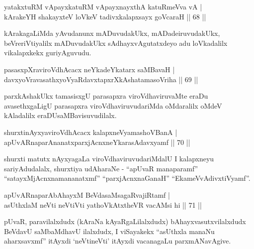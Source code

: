 \begin{shl}
yatakxtuRM vA\s payxkatuRM vA\s payxnayxthA katuRmeVva vA  | \\
kArakeYH shakayxteV loVkeV tadivxkalapxsayx goVcaraH  \hfill||  68 ||  
\end{shl}

\begin{artha}
kArakagaLiMda yAvudanunx mADuvudakUkx, mADadeiruvudakUkx, beVre\break riVtiyalilx mADuvudakUkx sAdhayxvAgutatxdeyo adu loVkadalilx vikalapxkekx guriyAguvudu.
\end{artha}


\begin{shl}
pasasxpXraviroVdhAcacx neYkadeYkatarx saMBavaH  | \\
davxyoVravasathxyoVyaRdavxtapxrXkAshatamasoVriha \hfill ||  69 ||  
\end{shl}

\begin{artha}
parxkAshakUkx tamasisxgU parasapxra viroVdhaviruvaMte eraDu avasethxgaLigU parasapxra viroVdhaviruvudariMda oMdaralilx oMdeV kAladalilx eraDU\break saMBavisuvudilalx.
\end{artha}

\begin{shl}
shurxtinAyxyaviroVdhAcacx kalapxneVyamashoVBanA  | \\
apUvARnaparAnanatxparxjAcnxneYkarasAdavxyamf \hfill||  70 ||  
\end{shl}

\begin{artha}
shurxti matutx nAyxyagaLa viroVdhaviruvudariMdalU I kalapxneyu sariyAdudalalx, shurxtiya udAharaNe - ``apUvaR manaparamf'' ``satayxMjAcnxnamananatxmf'' ``parxjAcnxnaGanaH'' ``EkameVvAdivxtiVyamf''. 
\end{artha}


\begin{shl}
apUvARnaparAbAhayxM BeVdasaMsagaRvajiRtamf  | \\
asUthxlaM neVti neVtiVti yathoVkAtxtheVR vacAMsi hi \hfill||  71 ||  
\end{shl}

\begin{artha}
pUvaR, paravilalxdudx (kAraNa kAyaRgaLilalxdudx) bAhayxvasutxvilalxdudx BeVdavU saMbaMdhavU ilalxdudx, I viSayakekx ``asUthxla manaNu aharxsavxmf'' itAyxdi `neVtineVti' itAyxdi vacanagaLu parxmANavAgive.
\end{artha}

